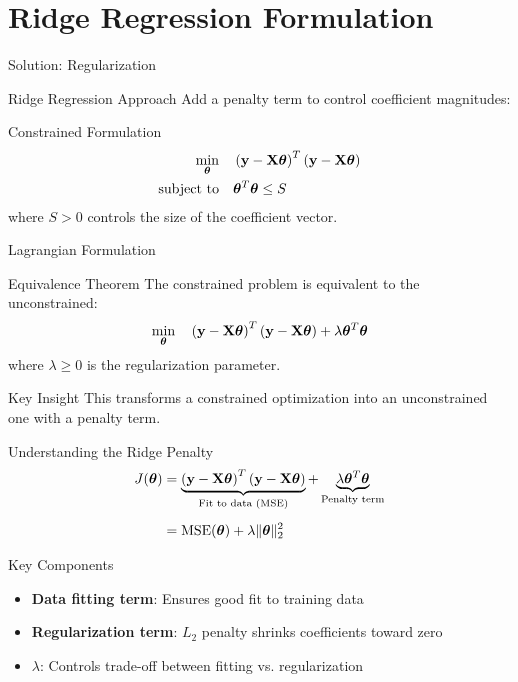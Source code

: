 \documentclass{beamer}
\begin{document}
\section{Ridge Regression Formulation}

\begin{frame}{Solution: Regularization}
\begin{theorembox}{Ridge Regression Approach}
Add a penalty term to control coefficient magnitudes:
\end{theorembox}
\pause

\begin{definitionbox}{Constrained Formulation}
\begin{align*}
\min_{\boldsymbol{\theta}} & \quad \left(\mathbf{y}-\mathbf{X}\boldsymbol{\theta}\right)^T\left(\mathbf{y}-\mathbf{X}\boldsymbol{\theta}\right) \\
\text{subject to} & \quad \boldsymbol{\theta}^T\boldsymbol{\theta} \leq S
\end{align*}
where $S > 0$ controls the size of the coefficient vector.
\end{definitionbox}
\end{frame}

\begin{frame}{Lagrangian Formulation}
\begin{theorembox}{Equivalence Theorem}
The constrained problem is equivalent to the unconstrained:
$$\min_{\boldsymbol{\theta}} \quad \left(\mathbf{y}-\mathbf{X}\boldsymbol{\theta}\right)^T\left(\mathbf{y}-\mathbf{X}\boldsymbol{\theta}\right) + \lambda \boldsymbol{\theta}^T\boldsymbol{\theta}$$
where $\lambda \geq 0$ is the regularization parameter.
\end{theorembox}
\pause

\begin{keypointsbox}{Key Insight}
This transforms a constrained optimization into an unconstrained one with a penalty term.
\end{keypointsbox}
\end{frame}

\begin{frame}{Understanding the Ridge Penalty}
\begin{align}
J(\boldsymbol{\theta}) &= \underbrace{\left(\mathbf{y}-\mathbf{X}\boldsymbol{\theta}\right)^T\left(\mathbf{y}-\mathbf{X}\boldsymbol{\theta}\right)}_{\text{Fit to data (MSE)}} + \underbrace{\lambda \boldsymbol{\theta}^T\boldsymbol{\theta}}_{\text{Penalty term}} \\[0.5em]
&= \text{MSE}(\boldsymbol{\theta}) + \lambda \|\boldsymbol{\theta}\|_2^2
\end{align}
\pause

\begin{keypointsbox}{Key Components}
\begin{itemize}
\item \textbf{Data fitting term}: Ensures good fit to training data
\item \textbf{Regularization term}: $L_2$ penalty shrinks coefficients toward zero
\item \textbf{$\lambda$}: Controls trade-off between fitting vs. regularization
\end{itemize}
\end{keypointsbox}
\end{frame}
\end{document}
